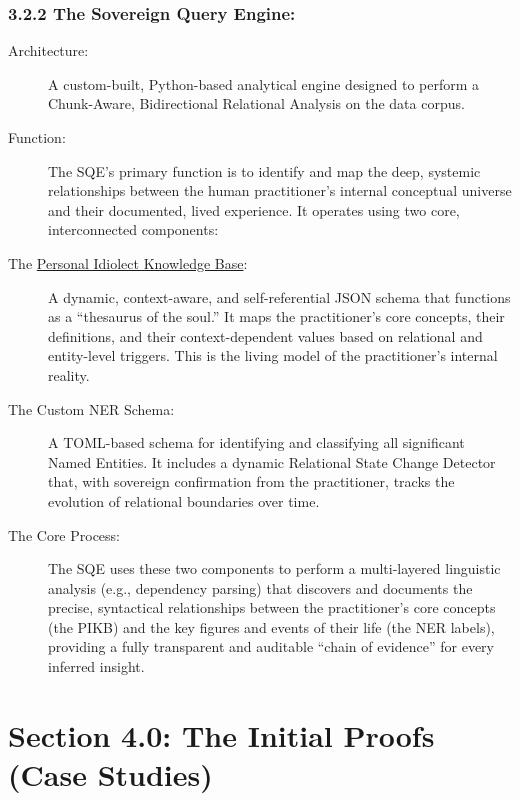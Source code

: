 \documentclass{article}
\begin{document}
\subsubsection*{3.2.2 The Sovereign Query Engine:}
\begin{description}
    \item[Architecture:] A custom-built, Python-based analytical engine designed to perform a Chunk-Aware, Bidirectional Relational Analysis on the data corpus.
    \item[Function:] The SQE's primary function is to identify and map the deep, systemic relationships between the human practitioner's internal conceptual universe and their documented, lived experience. It operates using two core, interconnected components:
    \item[The \hyperlink{gloss:pikb}{Personal Idiolect Knowledge Base}:] A dynamic, context-aware, and self-referential JSON schema that functions as a ``thesaurus of the soul.'' It maps the practitioner's core concepts, their definitions, and their context-dependent values based on relational and entity-level triggers. This is the living model of the practitioner's internal reality.
    \item[The Custom NER Schema:] A TOML-based schema for identifying and classifying all significant Named Entities. It includes a dynamic Relational State Change Detector that, with sovereign confirmation from the practitioner, tracks the evolution of relational boundaries over time.
    \item[The Core Process:] The SQE uses these two components to perform a multi-layered linguistic analysis (e.g., dependency parsing) that discovers and documents the precise, syntactical relationships between the practitioner's core concepts (the PIKB) and the key figures and events of their life (the NER labels), providing a fully transparent and auditable ``chain of evidence'' for every inferred insight.
\end{description}




\section*{Section 4.0: The Initial Proofs (Case Studies)}
\end{document}

